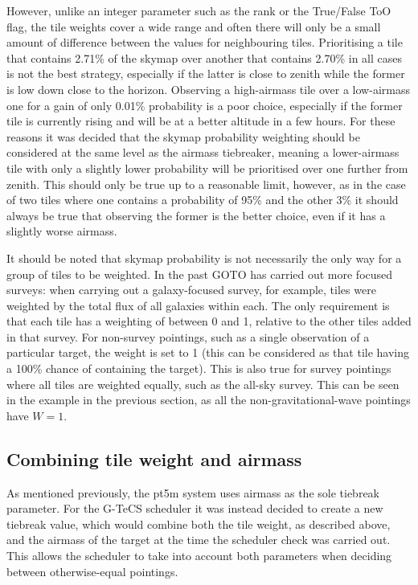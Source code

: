 \begin{colsection}
\begin{colsection}
However, unlike an integer parameter such as the rank or the True/False ToO flag, the tile weights cover a wide range and often there will only be a small amount of difference between the values for neighbouring tiles. Prioritising a tile that contains 2.71\% of the skymap over another that contains 2.70\% in all cases is not the best strategy, especially if the latter is close to zenith while the former is low down close to the horizon. Observing a high-airmass tile over a low-airmass one for a gain of only 0.01\% probability is a poor choice, especially if the former tile is currently rising and will be at a better altitude in a few hours. For these reasons it was decided that the skymap probability weighting should be considered at the same level as the airmass tiebreaker, meaning a lower-airmass tile with only a slightly lower probability will be prioritised over one further from zenith. This should only be true up to a reasonable limit, however, as in the case of two tiles where one contains a probability of 95\% and the other 3\% it should always be true that observing the former is the better choice, even if it has a slightly worse airmass.

It should be noted that skymap probability is not necessarily the only way for a group of tiles to be weighted. In the past GOTO has carried out more focused surveys: when carrying out a galaxy-focused survey, for example, tiles were weighted by the total flux of all galaxies within each. The only requirement is that each tile has a weighting of between 0 and 1, relative to the other tiles added in that survey. For non-survey pointings, such as a single observation of a particular target, the weight is set to 1 (this can be considered as that tile having a 100\% chance of containing the target). This is also true for survey pointings where all tiles are weighted equally, such as the all-sky survey. This can be seen in the example  in the previous section, as all the non-gravitational-wave pointings have $W=1$.

\end{colsection}

\newpage
\subsection{Combining tile weight and airmass}
\label{sec:wa}
\begin{colsection}

As mentioned previously, the pt5m system uses airmass as the sole tiebreak parameter. For the G-TeCS scheduler it was instead decided to create a new tiebreak value, which would combine both the tile weight, as described above, and the airmass of the target at the time the scheduler check was carried out. This allows the scheduler to take into account both parameters when deciding between otherwise-equal pointings.


\end{colsection}
\end{colsection}
